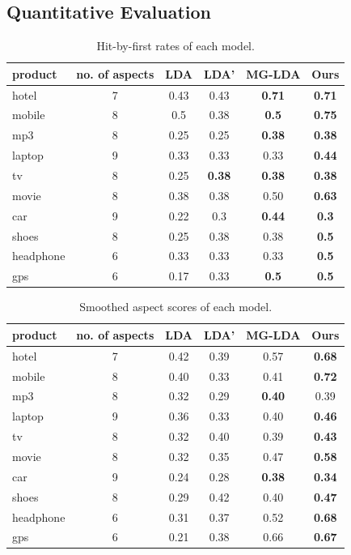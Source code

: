 \subsection{Quantitative Evaluation}

\begin{table}
\centering
\begin{tabular}{|l|c|c|c|c|c|}
    \hline
    product & no. of aspects & LDA & LDA' & MG-LDA & Ours \\ \hline\hline
    hotel & 7 & 0.43 & 0.43 & \textbf{0.71} & \textbf{0.71} \\ \hline 
    mobile & 8 & 0.5 & 0.38 & \textbf{0.5}  & \textbf{0.75} \\ \hline 
    mp3 & 8 & 0.25 & 0.25 & \textbf{0.38} & \textbf{0.38} \\ \hline
    laptop & 9 & 0.33 & 0.33 & 0.33 & \textbf{0.44} \\ \hline
    tv & 8 & 0.25 & \textbf{0.38} & \textbf{0.38} & \textbf{0.38} \\ \hline
    movie & 8 & 0.38 & 0.38 & 0.50 & \textbf{0.63} \\ \hline
    car & 9 & 0.22 & 0.3 & \textbf{0.44} & \textbf{0.3} \\ \hline
    shoes & 8 & 0.25 & 0.38 & 0.38 & \textbf{0.5} \\ \hline
    headphone & 6 & 0.33 & 0.33 & 0.33 & \textbf{0.5} \\ \hline
    gps & 6 & 0.17 & 0.33 & \textbf{0.5} & \textbf{0.5} \\ \hline
\end{tabular}
\caption{Hit-by-first rates of each model.}
\label{table:hit-by-first}
\end{table}

\begin{table}
\centering
\begin{tabular}{|l|c|c|c|c|c|}
    \hline
    product & no. of aspects & LDA & LDA' & MG-LDA & Ours \\ \hline\hline
    hotel & 7 & 0.42 & 0.39 & 0.57 & \textbf{0.68} \\ \hline
    mobile & 8 & 0.40 & 0.33 & 0.41  & \textbf{0.72} \\ \hline
    mp3 & 8 & 0.32 & 0.29 & \textbf{0.40} & 0.39 \\ \hline
    laptop & 9 & 0.36 & 0.33 & 0.40 & \textbf{0.46} \\ \hline
    tv & 8 & 0.32 & 0.40 & 0.39 & \textbf{0.43} \\ \hline
    movie & 8 & 0.32 & 0.35 & 0.47 & \textbf{0.58} \\ \hline
    car & 9 & 0.24 & 0.28 & \textbf{0.38} & \textbf{0.34} \\ \hline
    shoes & 8 & 0.29 & 0.42 & 0.40 & \textbf{0.47} \\ \hline
    headphone & 6 & 0.31 & 0.37 & 0.52 & \textbf{0.68} \\ \hline
    gps & 6 & 0.21 & 0.38 & 0.66 & \textbf{0.67} \\ \hline
\end{tabular}
\caption{Smoothed aspect scores of each model.}
\label{table:smoothed}
\end{table}

